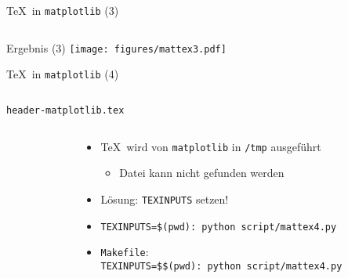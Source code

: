 \begin{frame}[fragile]{\TeX\ in \texttt{matplotlib} (3)}
  \inputminted{python}{script/mattex3.py}
\end{frame}

\AddToShipoutPictureFG*{\ShowFramePicture}
\begin{frame}{Ergebnis (3)}%
  \centering%
  \texttt{[image: figures/mattex3.pdf]}%
\end{frame}

\begin{frame}[fragile]{\TeX\ in \texttt{matplotlib} (4)}
  \inputminted{python}{script/mattex4.py}
\end{frame}

\begin{frame}[fragile]{\texttt{header-matplotlib.tex}}
  \begin{columns}[onlytextwidth]%
    \begin{column}{0.35\textwidth}%
      \small
      \inputminted{latex}{../common/header-matplotlib.tex}
    \end{column}%
    \hfill%
    \begin{column}{0.645\textwidth}%
      \begin{itemize}
        \item \TeX\ wird von \texttt{matplotlib} in \texttt{/tmp} ausgeführt
          \begin{itemize}
            \item Datei kann nicht gefunden werden
          \end{itemize}
        \item Lösung: \texttt{TEXINPUTS} setzen!
        \item \texttt{TEXINPUTS=\$(pwd): python script/mattex4.py}
        \item \texttt{Makefile}:\\
          \texttt{TEXINPUTS=\$\$(pwd): python script/mattex4.py}
      \end{itemize}
    \end{column}%
  \end{columns}%
\end{frame}

%

